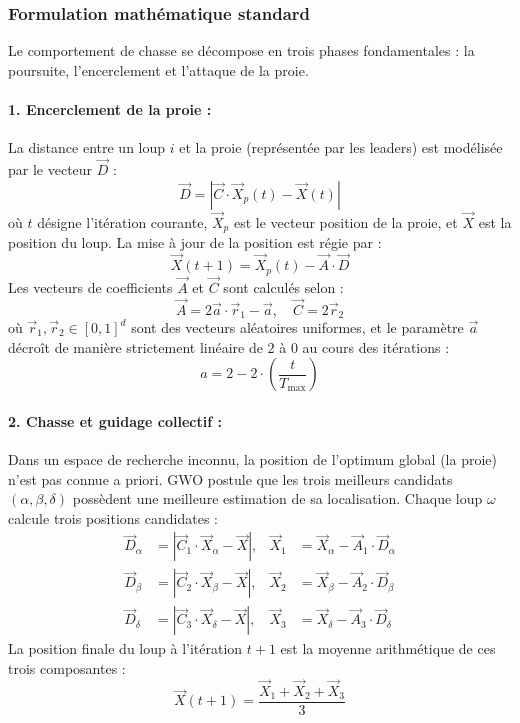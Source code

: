 \subsubsection{Formulation mathématique standard}
Le comportement de chasse se décompose en trois phases fondamentales : la poursuite, l'encerclement et l'attaque de la proie.

\paragraph{1. Encerclement de la proie :}
La distance entre un loup $i$ et la proie (représentée par les leaders) est modélisée par le vecteur $\vec{D}$ :
\begin{equation}
    \vec{D} = |\vec{C} \cdot \vec{X}_p(t) - \vec{X}(t)|
\end{equation}
où $t$ désigne l'itération courante, $\vec{X}_p$ est le vecteur position de la proie, et $\vec{X}$ est la position du loup. La mise à jour de la position est régie par :
\begin{equation}
    \vec{X}(t+1) = \vec{X}_p(t) - \vec{A} \cdot \vec{D}
\end{equation}
Les vecteurs de coefficients $\vec{A}$ et $\vec{C}$ sont calculés selon :
\begin{equation}
    \vec{A} = 2\vec{a} \cdot \vec{r}_1 - \vec{a}, \quad \vec{C} = 2\vec{r}_2
\end{equation}
où $\vec{r}_1, \vec{r}_2 \in [0, 1]^d$ sont des vecteurs aléatoires uniformes, et le paramètre $\vec{a}$ décroît de manière strictement linéaire de $2$ à $0$ au cours des itérations :
\begin{equation}
    a = 2 - 2 \cdot \left(\frac{t}{T_{\max}}\right)
\end{equation}

\paragraph{2. Chasse et guidage collectif :}
Dans un espace de recherche inconnu, la position de l'optimum global (la proie) n'est pas connue a priori. GWO postule que les trois meilleurs candidats $(\alpha, \beta, \delta)$ possèdent une meilleure estimation de sa localisation. Chaque loup $\omega$ calcule trois positions candidates :
\begin{align}
    \vec{D}_\alpha &= |\vec{C}_1 \cdot \vec{X}_\alpha - \vec{X}|, & \vec{X}_1 &= \vec{X}_\alpha - \vec{A}_1 \cdot \vec{D}_\alpha \\
    \vec{D}_\beta  &= |\vec{C}_2 \cdot \vec{X}_\beta - \vec{X}|,  & \vec{X}_2 &= \vec{X}_\beta - \vec{A}_2 \cdot \vec{D}_\beta \\
    \vec{D}_\delta &= |\vec{C}_3 \cdot \vec{X}_\delta - \vec{X}|, & \vec{X}_3 &= \vec{X}_\delta - \vec{A}_3 \cdot \vec{D}_\delta
\end{align}
La position finale du loup à l'itération $t+1$ est la moyenne arithmétique de ces trois composantes :
\begin{equation}
    \vec{X}(t+1) = \frac{\vec{X}_1 + \vec{X}_2 + \vec{X}_3}{3}
\end{equation}

